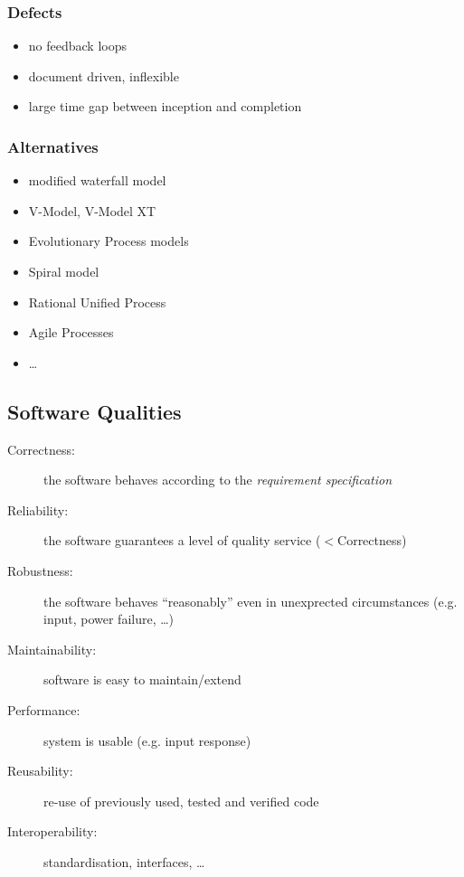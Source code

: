 \documentclass[a4paper, 10pt]{article}
\begin{document}
\subsubsection{Defects}
\begin{itemize}
	\item no feedback loops
	\item document driven, inflexible
	\item large time gap between inception and completion
\end{itemize}

\subsubsection{Alternatives}
\begin{itemize}
	\item modified waterfall model
	\item V-Model, V-Model XT
	\item Evolutionary Process models
	\item Spiral model
	\item Rational Unified Process
	\item Agile Processes
	\item \dots
\end{itemize}

\subsection{Software Qualities}
\begin{description}
	\item[Correctness:] the software behaves according to the \emph{requirement specification}
	\item[Reliability:] the software guarantees a level of quality service ($<$Correctness)
	\item[Robustness:] the software behaves ``reasonably'' even in unexprected circumstances (e.g. input, power failure, \dots)
	\item[Maintainability:] software is easy to maintain/extend
	\item[Performance:] system is usable (e.g. input response)
	\item[Reusability:] re-use of previously used, tested and verified code
	\item[Interoperability:] standardisation, interfaces, \dots
\end{description}
\end{document}
